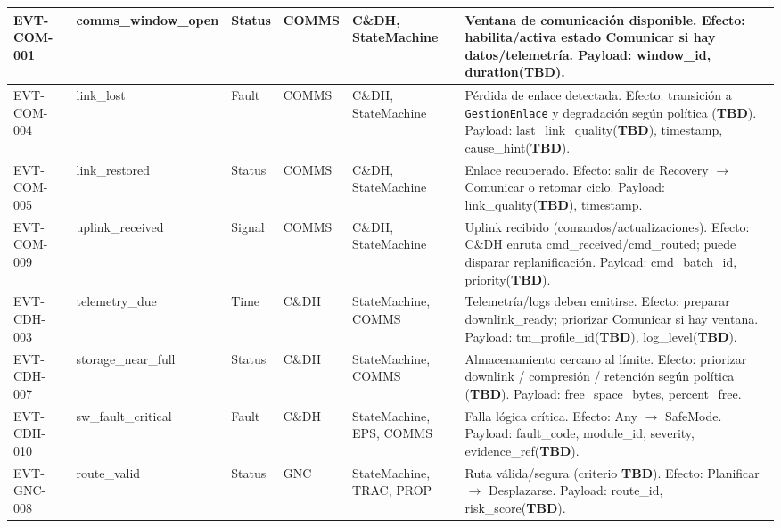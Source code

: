 \begin{landscape}
\begin{longtable}{|p{2.0cm}|p{3.5cm}|p{1.4cm}|p{2.8cm}|p{3.2cm}|p{8.5cm}|}
EVT-COM-001 & comms\_window\_open & Status & COMMS & C\&DH, StateMachine &
Ventana de comunicación disponible. Efecto: habilita/activa estado Comunicar si hay datos/telemetría.
Payload: window\_id, duration(\textbf{TBD}). \\
\hline

EVT-COM-004 & link\_lost & Fault & COMMS & C\&DH, StateMachine &
Pérdida de enlace detectada. Efecto: transición a \texttt{GestionEnlace} y degradación según política (\textbf{TBD}).
Payload: last\_link\_quality(\textbf{TBD}), timestamp, cause\_hint(\textbf{TBD}). \\
\hline

EVT-COM-005 & link\_restored & Status & COMMS & C\&DH, StateMachine &
Enlace recuperado. Efecto: salir de Recovery $\rightarrow$ Comunicar o retomar ciclo.
Payload: link\_quality(\textbf{TBD}), timestamp. \\
\hline

EVT-COM-009 & uplink\_received & Signal & COMMS & C\&DH, StateMachine &
Uplink recibido (comandos/actualizaciones). Efecto: C\&DH enruta cmd\_received/cmd\_routed; puede disparar replanificación.
Payload: cmd\_batch\_id, priority(\textbf{TBD}). \\
\hline

EVT-CDH-003 & telemetry\_due & Time & C\&DH & StateMachine, COMMS &
Telemetría/logs deben emitirse. Efecto: preparar downlink\_ready; priorizar Comunicar si hay ventana.
Payload: tm\_profile\_id(\textbf{TBD}), log\_level(\textbf{TBD}). \\
\hline

EVT-CDH-007 & storage\_near\_full & Status & C\&DH & StateMachine, COMMS &
Almacenamiento cercano al límite. Efecto: priorizar downlink / compresión / retención según política (\textbf{TBD}).
Payload: free\_space\_bytes, percent\_free. \\
\hline

EVT-CDH-010 & sw\_fault\_critical & Fault & C\&DH & StateMachine, EPS, COMMS &
Falla lógica crítica. Efecto: Any $\rightarrow$ SafeMode. Payload: fault\_code, module\_id, severity, evidence\_ref(\textbf{TBD}). \\
\hline

EVT-GNC-008 & route\_valid & Status & GNC & StateMachine, TRAC, PROP &
Ruta válida/segura (criterio \textbf{TBD}). Efecto: Planificar $\rightarrow$ Desplazarse.
Payload: route\_id, risk\_score(\textbf{TBD}). \\
\hline


\end{longtable}
\end{landscape}
